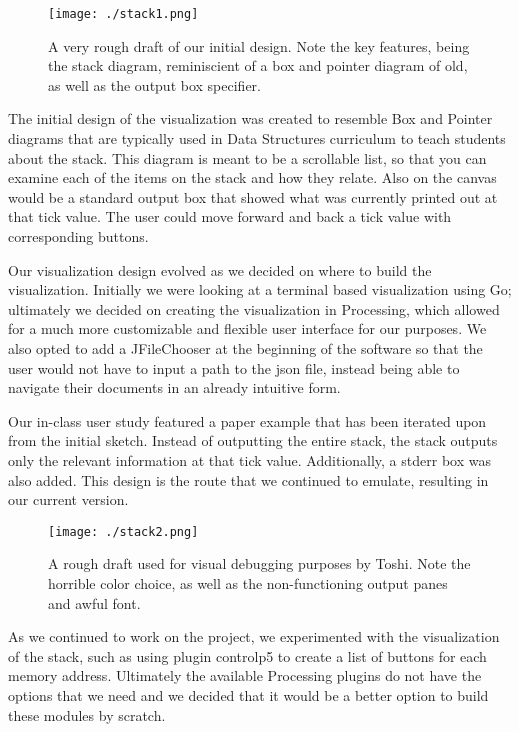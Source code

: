 \documentclass[12pt]{article}
\begin{document}
\begin{figure}[h!]
  \centering
  \texttt{[image: ./stack1.png]}
  \caption{A very rough draft of our initial design. Note the key features, being the stack diagram,
           reminiscient of a box and pointer diagram of old, as well as the output box specifier.}
\end{figure}

The initial design of the visualization was created to resemble Box and Pointer diagrams that are
typically used in Data Structures curriculum to teach students about the stack. This diagram is meant
to be a scrollable list, so that you can examine each of the items on the stack and how they relate.
Also on the canvas would be a standard output box that showed what was currently printed out at
that tick value. The user could move forward and back a tick value with corresponding buttons.

Our visualization design evolved as we decided on where to build the visualization. Initially we
were looking at a terminal based visualization using Go; ultimately we decided on creating the
visualization in Processing, which allowed for a much more customizable and flexible user
interface for our purposes.  We also opted to add a JFileChooser at the beginning of the software
so that the user would not have to input a path to the json file, instead being able to navigate
their documents in an already intuitive form.

Our in-class user study featured a paper example that has been iterated upon from the initial
sketch. Instead of outputting the entire stack, the stack outputs only the relevant information
at that tick value.  Additionally, a stderr box was also added.  This design is the route that
we continued to emulate, resulting in our current version. 

\begin{figure}[h!]
  \centering
  \texttt{[image: ./stack2.png]}
  \caption{A rough draft used for visual debugging purposes by Toshi. Note the horrible color choice,
           as well as the non-functioning output panes and awful font.}
\end{figure}

As we continued to work on the project, we experimented with the visualization of the stack, such
as using plugin controlp5 to create a list of buttons for each memory address. Ultimately the
available Processing plugins do not have the options that we need and we decided that it would
be a better option to build these modules by scratch.
\end{document}
